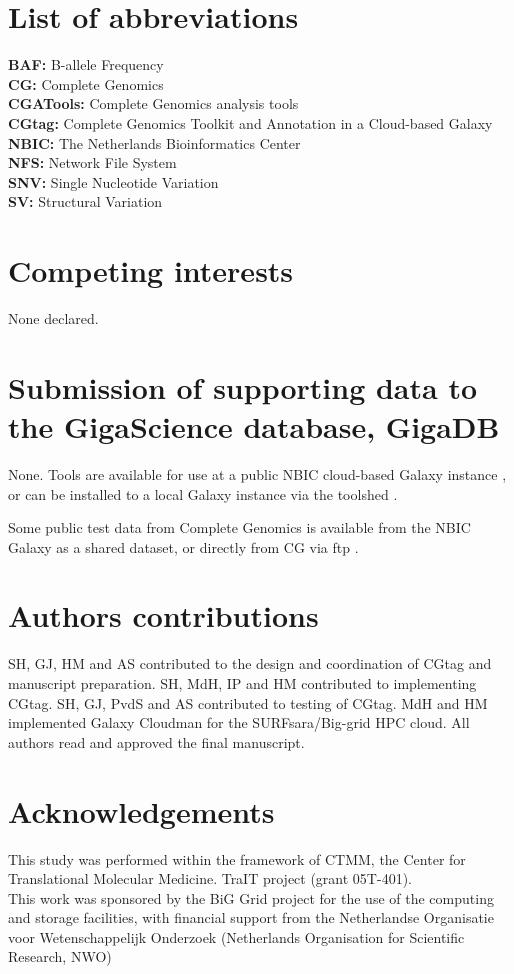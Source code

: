 \section*{List of abbreviations}

\textbf{BAF:} B-allele Frequency \\
\textbf{CG:} Complete Genomics \\
\textbf{CGATools:} Complete Genomics analysis tools \\
\textbf{CGtag:} Complete Genomics Toolkit and Annotation in a Cloud-based Galaxy\\
\textbf{NBIC:} The Netherlands Bioinformatics Center\\
\textbf{NFS:} Network File System \\
\textbf{SNV:} Single Nucleotide Variation\\
\textbf{SV:} Structural Variation\\


\section*{Competing interests}

None declared.


\section*{Submission of supporting data to the GigaScience database, GigaDB}

None. Tools are available for use at a public NBIC cloud-based Galaxy instance \cite{url-nbicgalaxy}, or can be installed to a local Galaxy instance via the toolshed \cite{url-nbictoolshed}.

Some public test data from Complete Genomics is available from the NBIC Galaxy as a shared dataset, or directly from CG via ftp \cite{url-cgftp}.


\section*{Authors contributions}

SH, GJ, HM and AS contributed to the design and coordination of CGtag and manuscript preparation. SH, MdH, IP and HM contributed to implementing CGtag.  SH, GJ, PvdS and AS contributed to testing of CGtag. MdH and HM implemented Galaxy Cloudman for the SURFsara/Big-grid HPC cloud. All authors read and approved the final manuscript.


\section*{Acknowledgements}

This study was performed within the framework of CTMM, the Center for Translational Molecular Medicine. TraIT project (grant 05T-401). \\

This work was sponsored by the BiG Grid project for the use of the computing and storage facilities, with financial support from the Netherlandse Organisatie voor Wetenschappelijk Onderzoek (Netherlands Organisation for Scientific Research, NWO)



